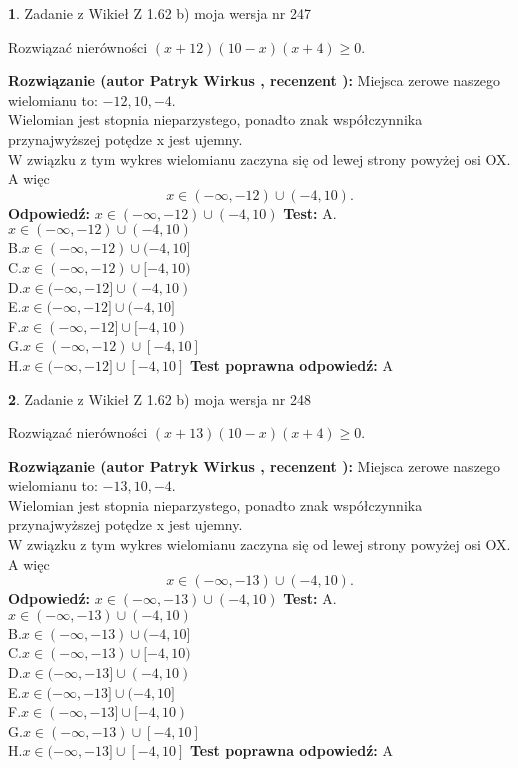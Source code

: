 \documentclass[12pt, a4paper]{article}
\theoremstyle{definition} %
\newtheorem{zad}{}
\newcommand{\zadStart}[1]{\begin{zad}#1\newline}
\newcommand{\zadStop}{\end{zad}}
\newcommand{\rozwStart}[2]{\noindent \textbf{Rozwiązanie (autor #1 , recenzent #2): }\newline}
\newcommand{\rozwStop}{\newline}
\newcommand{\odpStart}{\noindent \textbf{Odpowiedź:}\newline}
\newcommand{\odpStop}{\newline}
\newcommand{\testStart}{\noindent \textbf{Test:}\newline}
\newcommand{\testStop}{\newline}
\newcommand{\kluczStart}{\noindent \textbf{Test poprawna odpowiedź:}\newline}
\newcommand{\kluczStop}{\newline}
\begin{document}
\zadStart{Zadanie z Wikieł Z 1.62 b) moja wersja nr 247}

Rozwiązać nierówności $(x+12)(10-x)(x+4)\ge0$.
\zadStop
\rozwStart{Patryk Wirkus}{}
Miejsca zerowe naszego wielomianu to: $-12, 10, -4$.\\
Wielomian jest stopnia nieparzystego, ponadto znak współczynnika przy\linebreak najwyższej potędze x jest ujemny.\\ W związku z tym wykres wielomianu zaczyna się od lewej strony powyżej osi OX. A więc $$x \in (-\infty,-12) \cup (-4,10).$$
\rozwStop
\odpStart
$x \in (-\infty,-12) \cup (-4,10)$
\odpStop
\testStart
A.$x \in (-\infty,-12) \cup (-4,10)$\\
B.$x \in (-\infty,-12) \cup (-4,10]$\\
C.$x \in (-\infty,-12) \cup [-4,10)$\\
D.$x \in (-\infty,-12] \cup (-4,10)$\\
E.$x \in (-\infty,-12] \cup (-4,10]$\\
F.$x \in (-\infty,-12] \cup [-4,10)$\\
G.$x \in (-\infty,-12) \cup [-4,10]$\\
H.$x \in (-\infty,-12] \cup [-4,10]$
\testStop
\kluczStart
A
\kluczStop



\zadStart{Zadanie z Wikieł Z 1.62 b) moja wersja nr 248}

Rozwiązać nierówności $(x+13)(10-x)(x+4)\ge0$.
\zadStop
\rozwStart{Patryk Wirkus}{}
Miejsca zerowe naszego wielomianu to: $-13, 10, -4$.\\
Wielomian jest stopnia nieparzystego, ponadto znak współczynnika przy\linebreak najwyższej potędze x jest ujemny.\\ W związku z tym wykres wielomianu zaczyna się od lewej strony powyżej osi OX. A więc $$x \in (-\infty,-13) \cup (-4,10).$$
\rozwStop
\odpStart
$x \in (-\infty,-13) \cup (-4,10)$
\odpStop
\testStart
A.$x \in (-\infty,-13) \cup (-4,10)$\\
B.$x \in (-\infty,-13) \cup (-4,10]$\\
C.$x \in (-\infty,-13) \cup [-4,10)$\\
D.$x \in (-\infty,-13] \cup (-4,10)$\\
E.$x \in (-\infty,-13] \cup (-4,10]$\\
F.$x \in (-\infty,-13] \cup [-4,10)$\\
G.$x \in (-\infty,-13) \cup [-4,10]$\\
H.$x \in (-\infty,-13] \cup [-4,10]$
\testStop
\kluczStart
A
\kluczStop
\end{document}
